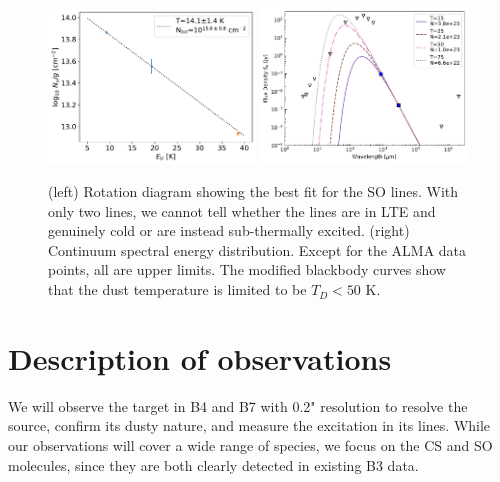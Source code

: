 \documentclass[12pt,a4paper]{article}  %
\begin{document}
\begin{figure}
    \centering
    \includegraphics[width=0.49\textwidth]{figures/LTE_rotationdiagram_fit.pdf}
    \includegraphics[width=0.49\textwidth]{figures/SED_with_upperlimits_VLA.pdf}
    \caption{(left) Rotation diagram showing the best fit for the SO lines.
    With only two lines, we cannot tell whether the lines are in LTE and genuinely cold or are instead sub-thermally excited.
    (right) Continuum spectral energy distribution. Except for the ALMA data points, all are upper limits.  The modified blackbody curves show that the dust temperature is limited to be $T_D<50$ K.
    }
    \label{fig:LTErotationdiagram}
\end{figure}




\section{Description of observations}

We will observe the target in B4 and B7 with 0.2" resolution to resolve the source, confirm its dusty nature, and measure the excitation in its lines.
While our observations will cover a wide range of species, we focus on the CS and SO molecules, since they are both clearly detected in existing B3 data.

\end{document}
